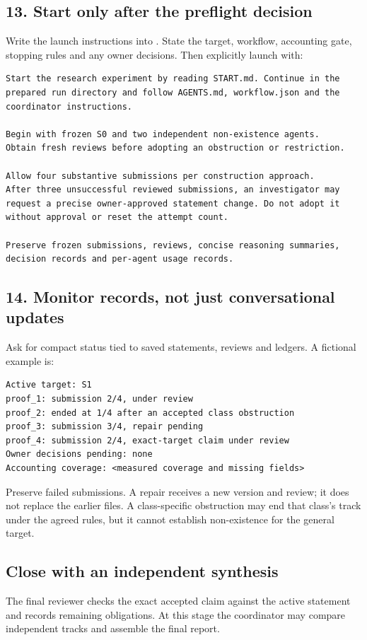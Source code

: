 \documentclass[11pt,a4paper]{article}
\newcommand{\pathcode}[1]{\texttt{\small\detokenize{#1}}}
\begin{document}
\subsection*{13. Start only after the preflight decision}
Write the launch instructions into \pathcode{START.md}. State the target, workflow, accounting gate, stopping rules and any owner decisions. Then explicitly launch with:
\begin{lstlisting}
Start the research experiment by reading START.md. Continue in the
prepared run directory and follow AGENTS.md, workflow.json and the
coordinator instructions.

Begin with frozen S0 and two independent non-existence agents.
Obtain fresh reviews before adopting an obstruction or restriction.

Allow four substantive submissions per construction approach.
After three unsuccessful reviewed submissions, an investigator may
request a precise owner-approved statement change. Do not adopt it
without approval or reset the attempt count.

Preserve frozen submissions, reviews, concise reasoning summaries,
decision records and per-agent usage records.
\end{lstlisting}

\subsection*{14. Monitor records, not just conversational updates}
Ask for compact status tied to saved statements, reviews and ledgers. A fictional example is:
\begin{lstlisting}
Active target: S1
proof_1: submission 2/4, under review
proof_2: ended at 1/4 after an accepted class obstruction
proof_3: submission 3/4, repair pending
proof_4: submission 2/4, exact-target claim under review
Owner decisions pending: none
Accounting coverage: <measured coverage and missing fields>
\end{lstlisting}

Preserve failed submissions. A repair receives a new version and review; it does not replace the earlier files. A class-specific obstruction may end that class's track under the agreed rules, but it cannot establish non-existence for the general target.

\subsection*{Close with an independent synthesis}
The final reviewer checks the exact accepted claim against the active statement and records remaining obligations. At this stage the coordinator may compare independent tracks and assemble the final report.
\end{document}

